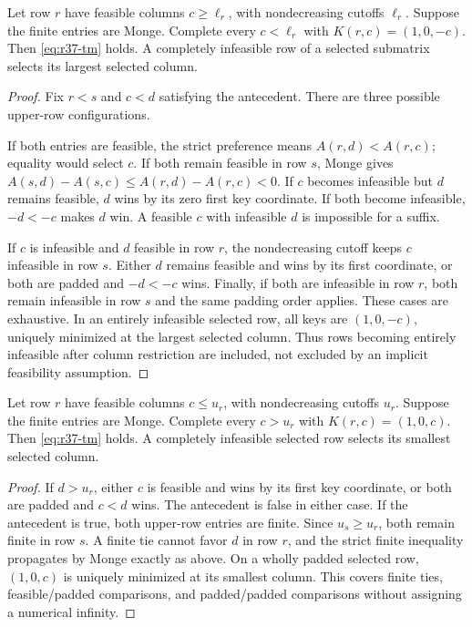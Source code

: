 \begin{lemma}\label{lem:r37-suffix}
Let row $r$ have feasible columns $c\geq\ell_r$, with nondecreasing cutoffs $\ell_r$. Suppose the finite entries are Monge. Complete every $c<\ell_r$ with $K(r,c)=(1,0,-c)$. Then \eqref{eq:r37-tm} holds. A completely infeasible row of a selected submatrix selects its largest selected column.
\end{lemma}
\begin{proof}
Fix $r<s$ and $c<d$ satisfying the antecedent. There are three possible upper-row configurations.

If both entries are feasible, the strict preference means $A(r,d)<A(r,c)$; equality would select $c$. If both remain feasible in row $s$, Monge gives $A(s,d)-A(s,c)\leq A(r,d)-A(r,c)<0$. If $c$ becomes infeasible but $d$ remains feasible, $d$ wins by its zero first key coordinate. If both become infeasible, $-d<-c$ makes $d$ win. A feasible $c$ with infeasible $d$ is impossible for a suffix.

If $c$ is infeasible and $d$ feasible in row $r$, the nondecreasing cutoff keeps $c$ infeasible in row $s$. Either $d$ remains feasible and wins by its first coordinate, or both are padded and $-d<-c$ wins. Finally, if both are infeasible in row $r$, both remain infeasible in row $s$ and the same padding order applies. These cases are exhaustive. In an entirely infeasible selected row, all keys are $(1,0,-c)$, uniquely minimized at the largest selected column. Thus rows becoming entirely infeasible after column restriction are included, not excluded by an implicit feasibility assumption.
\end{proof}

\begin{lemma}\label{lem:r37-prefix}
Let row $r$ have feasible columns $c\leq u_r$, with nondecreasing cutoffs $u_r$. Suppose the finite entries are Monge. Complete every $c>u_r$ with $K(r,c)=(1,0,c)$. Then \eqref{eq:r37-tm} holds. A completely infeasible selected row selects its smallest selected column.
\end{lemma}
\begin{proof}
If $d>u_r$, either $c$ is feasible and wins by its first key coordinate, or both are padded and $c<d$ wins. The antecedent is false in either case. If the antecedent is true, both upper-row entries are finite. Since $u_s\geq u_r$, both remain finite in row $s$. A finite tie cannot favor $d$ in row $r$, and the strict finite inequality propagates by Monge exactly as above. On a wholly padded selected row, $(1,0,c)$ is uniquely minimized at its smallest column. This covers finite ties, feasible/padded comparisons, and padded/padded comparisons without assigning a numerical infinity.
\end{proof}

